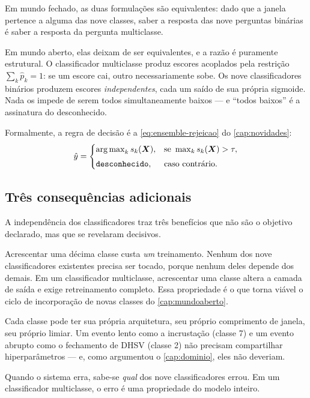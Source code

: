 \begin{destaque}
Em mundo fechado, as duas formulações são equivalentes: dado que a janela pertence a
alguma das nove classes, saber a resposta das nove perguntas binárias é saber a resposta
da pergunta multiclasse.

Em mundo aberto, elas deixam de ser equivalentes, e a razão é puramente estrutural.
O classificador multiclasse produz escores acoplados pela restrição
$\sum_k \hat{p}_k = 1$: se um escore cai, outro necessariamente sobe. Os nove
classificadores binários produzem escores \emph{independentes}, cada um saído de sua
própria sigmoide. Nada os impede de serem todos simultaneamente baixos --- e
``todos baixos'' é a assinatura do desconhecido.
\end{destaque}

Formalmente, a regra de decisão é a \cref{eq:ensemble-rejeicao} do \cref{cap:novidades}:
\[
  \hat{y} = \begin{cases}
    \operatorname*{arg\,max}_{k} s_k(\bm{X}), & \text{se } \max_k s_k(\bm{X}) > \tau, \\[0.3em]
    \texttt{desconhecido},    & \text{caso contrário.}
  \end{cases}
\]

\subsection{Três consequências adicionais}

A independência dos classificadores traz três benefícios que não são o objetivo
declarado, mas que se revelaram decisivos.

\begin{description}[leftmargin=0pt,style=nextline,itemsep=0.5em]

\item[Extensibilidade incremental.] Acrescentar uma décima classe custa \emph{um}
treinamento. Nenhum dos nove classificadores existentes precisa ser tocado, porque
nenhum deles depende dos demais. Em um classificador multiclasse, acrescentar uma classe
altera a camada de saída e exige retreinamento completo. Essa propriedade é o que torna
viável o ciclo de incorporação de novas classes do \cref{cap:mundoaberto}.

\item[Otimização independente.] Cada classe pode ter sua própria arquitetura, seu
próprio comprimento de janela, seu próprio limiar. Um evento lento como a incrustação
(classe 7) e um evento abrupto como o fechamento de DHSV (classe 2) não precisam
compartilhar hiperparâmetros --- e, como argumentou o \cref{cap:dominio}, eles não
deveriam.

\item[Diagnóstico interpretável.] Quando o sistema erra, sabe-se \emph{qual} dos nove
classificadores errou. Em um classificador multiclasse, o erro é uma propriedade do
modelo inteiro.

\end{description}

